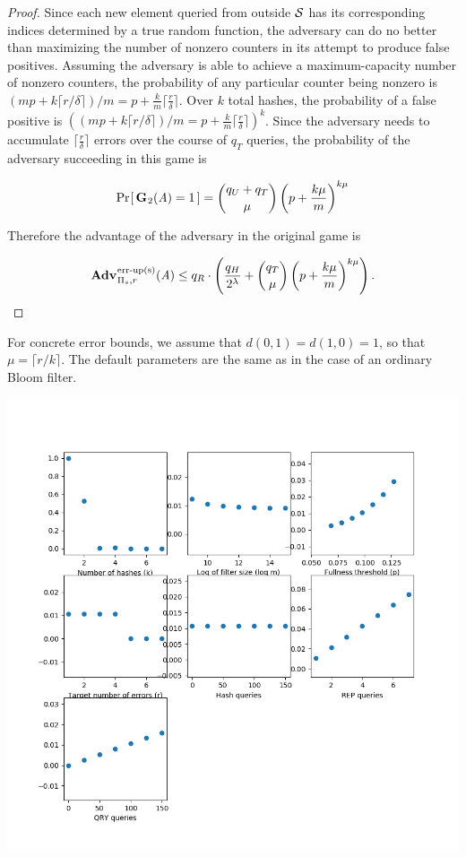 \begin{proof}
Since each new element queried from outside $\mathcal{S}$ has its corresponding indices determined by a true random function, the adversary can do no better than maximizing the number of nonzero counters in its attempt to produce false positives. Assuming the adversary is able to achieve a maximum-capacity number of nonzero counters, the probability of any particular counter being nonzero is $(mp + k\lceil r/\delta \rceil)/m = p + \frac{k}{m}\lceil\frac{r}{\delta}\rceil$. Over $k$ total hashes, the probability of a false positive is $\left((mp + k\lceil r/\delta \rceil)/m = p + \frac{k}{m}\lceil\frac{r}{\delta}\rceil\right)^k$. Since the adversary needs to accumulate $\lceil\frac{r}{\delta}\rceil$ errors over the course of $q_T$ queries, the probability of the adversary succeeding in this game is

$$\Pr\hspace{-1pt}\left[\,\mathbf{G}\hspace{0.5pt}_2(\mathit{A}) = 1\,\right] = \binom{q_U + q_T}{\mu}\left(p+\frac{k\mu}{m}\right)^{k\mu}$$

Therefore the advantage of the adversary in the original game is

$$\Adv{\erreps}_{\struct_s,r}(\advA) \le q_R \cdot \left(\frac{q_H}{2^\lambda} + \binom{q_T}{\mu}\left(p+\frac{k\mu}{m}\right)^{k\mu}\right).$$\missingqed

\end{proof}

For concrete error bounds, we assume that $d(0,1) = d(1,0) = 1$, so that $\mu = \lceil r/k \rceil$. The default parameters are the same as in the case of an ordinary Bloom filter.

\includegraphics[scale=0.75]{CBF_Fig}

